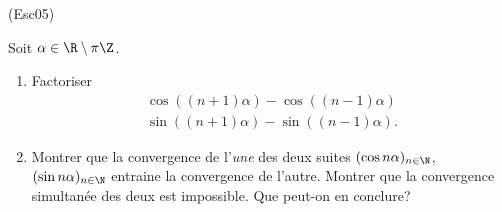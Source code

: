 \begin{tiny}(Esc05)\end{tiny} Soit $\alpha \in \R \setminus \pi \Z$.
\begin{enumerate}
 \item Factoriser
\begin{align*}
\cos((n+1)\alpha) - \cos((n-1)\alpha) \\ \sin((n+1)\alpha) - \sin((n-1)\alpha).
\end{align*}
 \item Montrer que la convergence de l'\emph{une} des deux suites $(\cos n\alpha )_{n\in \N}$, $(\sin n\alpha )_{n\in \N}$ entraine la convergence de l'autre. Montrer que la convergence simultan{\'e}e des deux est impossible. Que peut-on en conclure?
\end{enumerate}
